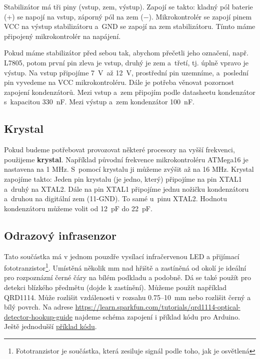 Stabilizátor má tři piny (vstup, zem, výstup). Zapojí se takto: kladný pól baterie (+) se napojí na vstup, záporný pól na zem ($-$). 
Mikrokontrolér se zapojí pinem VCC na výstup stabilizátoru a~GND  se zapojí na zem stabilizátoru. 
Tímto máme připojený mikrokontrolér na napájení.


Pokud máme stabilizátor před sebou tak, abychom přečetli jeho označení, např. L7805, 
potom první pin zleva je vstup, druhý je zem a~třetí, tj. úplně vpravo je výstup. 
Na vstup připojíme 7~V~až 12~V, prostřední pin uzemníme, a~poslední pin vyvedeme na VCC mikrokontroléru. 
Dále je potřeba věnovat pozornost zapojení kondenzátorů. 
Mezi vstup a~zem připojím podle datasheetu kondenzátor s~kapacitou 330~nF. Mezi výstup a~zem kondenzátor 100~nF. 


\subsection{Krystal}
Pokud budeme potřebovat provozovat některé procesory na vyšší frekvenci, použijeme {\bf krystal}. 
Například původní frekvence mikrokontroléru ATMega16 je nastavena na 1 MHz. S~pomocí krystalu ji můžeme zvýšit až na 16 MHz. 
Krystal zapojíme takto: Jeden pin krystalu (je jedno, který) připojíme na pin XTAL1 a~druhý na XTAL2. 
Dále na pin XTAL1 připojíme jednu nožičku kondenzátoru a~druhou na digitální zem (11-GND). 
To samé u~pinu XTAL2. Hodnotu kondenzátoru můžeme volit od 12~pF do 22~pF.

\subsection{Odrazový infrasenzor}

 \label{qrd1114} Tato součástka má v jednom pouzdře vysílací infračervenou LED a přijímací fototranzistor\footnote{Fototranzistor je součástka, která zesiluje signál podle toho, jak je osvětlená}. Umístěná několik mm nad hřiště a zastíněná od okolí je ideální pro rozpoznázní  černé čáry na bílém podkladu a podobně. Dá se také použít pro detekci blízkého předmětu (dojde k zastínění).
Můžeme použít například QRD1114. Může rozlišit vzdálenosti v rozsahu 0.75--10~mm nebo rozlišit černý a bílý povrch.  
Na adrese
\url{https://learn.sparkfun.com/tutorials/qrd1114-optical-detector-hookup-guide} najdeme schéma zapojení i příklad kódu pro Arduino. Ještě jednodušší \hyperref[prog:qrd1114]{příklad kódu}.


